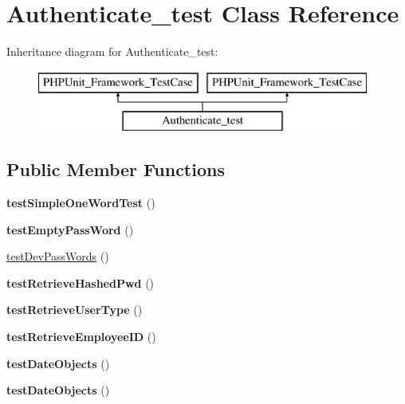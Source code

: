 \hypertarget{classAuthenticate__test}{\section{Authenticate\-\_\-test Class Reference}
\label{classAuthenticate__test}
}
Inheritance diagram for Authenticate\-\_\-test\-:\begin{figure}[H]
\begin{center}
\leavevmode
\includegraphics[height=2.000000cm]{classAuthenticate__test}
\end{center}
\end{figure}
\subsection*{Public Member Functions}
\begin{DoxyCompactItemize}
\item 
\hypertarget{classAuthenticate__test_ac55332d4112808f6fea63d5331ab2fde}{{\bfseries test\-Simple\-One\-Word\-Test} ()}\label{classAuthenticate__test_ac55332d4112808f6fea63d5331ab2fde}

\item 
\hypertarget{classAuthenticate__test_aa472c88e650a995f0313bfc174ccffd4}{{\bfseries test\-Empty\-Pass\-Word} ()}\label{classAuthenticate__test_aa472c88e650a995f0313bfc174ccffd4}

\item 
\hyperlink{classAuthenticate__test_a07e33598fb0cc3d9f982d3c76613a7c4}{test\-Dev\-Pass\-Words} ()
\item 
\hypertarget{classAuthenticate__test_ac274cadcd94182c018efb8e0882bf5fe}{{\bfseries test\-Retrieve\-Hashed\-Pwd} ()}\label{classAuthenticate__test_ac274cadcd94182c018efb8e0882bf5fe}

\item 
\hypertarget{classAuthenticate__test_ac7058f883cd0524ba6500251fa481f7e}{{\bfseries test\-Retrieve\-User\-Type} ()}\label{classAuthenticate__test_ac7058f883cd0524ba6500251fa481f7e}

\item 
\hypertarget{classAuthenticate__test_a0b9960005cf588d1aa3a47d716ec9966}{{\bfseries test\-Retrieve\-Employee\-I\-D} ()}\label{classAuthenticate__test_a0b9960005cf588d1aa3a47d716ec9966}

\item 
\hypertarget{classAuthenticate__test_adbb95cf4052bc73408c578c458745ce8}{{\bfseries test\-Date\-Objects} ()}\label{classAuthenticate__test_adbb95cf4052bc73408c578c458745ce8}

\item 
\hypertarget{classAuthenticate__test_adbb95cf4052bc73408c578c458745ce8}{{\bfseries test\-Date\-Objects} ()}\label{classAuthenticate__test_adbb95cf4052bc73408c578c458745ce8}

\end{DoxyCompactItemize}


